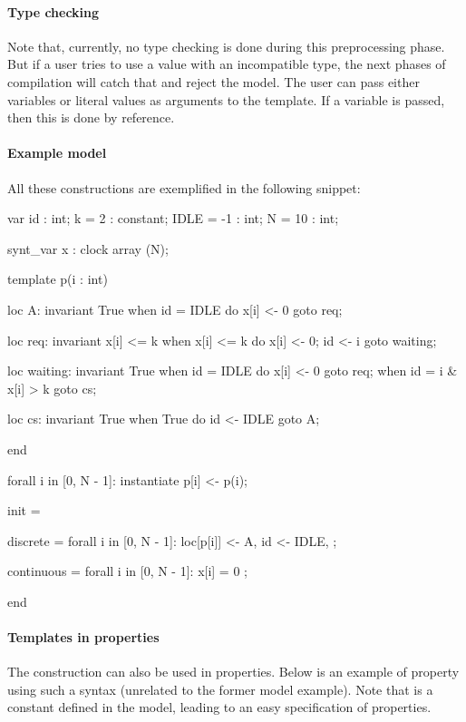 \paragraph{Type checking}
Note that, currently, no type checking is done during this preprocessing phase.
But if a user tries to use a value with an incompatible type, the next phases of compilation will catch that and reject the model.
The user can pass either variables or literal values as arguments to the template.
If a variable is passed, then this is done by reference.


\paragraph{Example model}
All these constructions are exemplified in the following snippet:

\begin{example}
\begin{IMITATORmodel}
var
    id        : int;
    k = 2     : constant;
    IDLE = -1 : int;
    N = 10    : int;

synt_var
    x : clock array (N);

template p(i : int)

loc A: invariant True
  when id = IDLE do { x[i] <- 0 } goto req;

loc req: invariant x[i] <= k
  when x[i] <= k do { x[i] <- 0; id <- i } goto waiting;

loc waiting: invariant True
  when id = IDLE do { x[i] <- 0 } goto req;
  when id = i & x[i] > k goto cs;

loc cs: invariant True
  when True do { id <- IDLE } goto A;

end

forall i in [0, N - 1]: instantiate p[i] <- p(i);

init = {

    discrete =
        forall i in [0, N - 1]: loc[p[i]] <- A,
        id <- IDLE,
    ;

    continuous =
        forall i in [0, N - 1]: x[i] = 0
    ;
}

end
\end{IMITATORmodel}
\end{example}

\paragraph{Templates in properties}
The  construction can also be used in properties.
Below is an example of property using such a syntax (unrelated to the former model example).
Note that  is a constant defined in the model, leading to an easy specification of properties.

